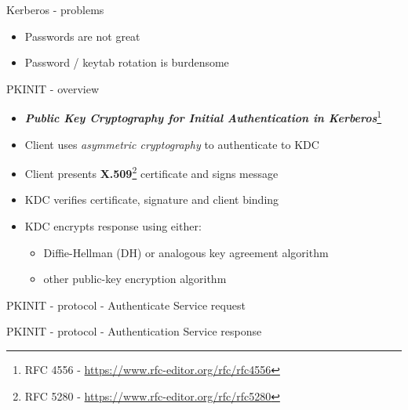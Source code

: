 \documentclass[ignorenonframetext,aspectratio=169,12pt]{beamer}
\def\svgwidth{4cm}
\begin{document}
\begin{frame}{Kerberos - problems}
\protect\hypertarget{kerberos-problems}{}

\begin{itemize}
    \item Passwords are not great
    \item Password / keytab rotation is burdensome
\end{itemize}

\end{frame}


\begin{frame}{PKINIT - overview}
\protect\hypertarget{pkinit-overview}{}
\begin{itemize}
    \item \textbf{\em Public Key Cryptography for Initial Authentication in
        Kerberos}\footnote{RFC 4556 - \url{https://www.rfc-editor.org/rfc/rfc4556}}
    \item Client uses {\em asymmetric cryptography} to authenticate to KDC
    \item Client presents
        {\bf X.509}\footnote{RFC 5280 - \url{https://www.rfc-editor.org/rfc/rfc5280}}
        certificate and signs message
    \item KDC verifies certificate, signature and client binding
    \item KDC encrypts response using either:
        \begin{itemize}
            \item Diffie-Hellman (DH) or analogous key agreement algorithm
            \item other public-key encryption algorithm
        \end{itemize}
\end{itemize}
\end{frame}

\begin{frame}{PKINIT - protocol - Authenticate Service request}
\begin{center}
\def\svgwidth{\textwidth}

\end{center}
\end{frame}

\begin{frame}{PKINIT - protocol - Authentication Service response}
\begin{center}
\def\svgwidth{\textwidth}

\end{center}
\end{frame}
\end{document}
